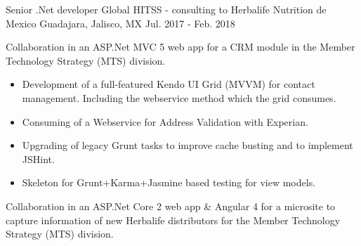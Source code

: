 \begin{cventries}
	\cventry
	{Senior .Net developer} %
	{Global HITSS - consulting to Herbalife Nutrition de Mexico} %
	{Guadajara, Jalisco, MX} %
	{Jul. 2017 - Feb. 2018} %
	{ %
		\begin{cvitems}
			\item {Collaboration in an ASP.Net MVC 5 web app for a CRM module in the Member Technology Strategy (MTS) division.}
			\begin{itemize}
				\item {Development of a full-featured Kendo UI Grid (MVVM) for contact management. Including the webservice method which the grid consumes.}
				\item {Consuming of a Webservice for Address Validation with Experian. }
				\item {Upgrading of legacy Grunt tasks to improve cache busting and to implement JSHint.}
				\item {Skeleton for Grunt+Karma+Jasmine based testing for view models.}
			\end{itemize}
			\item {Collaboration in an ASP.Net Core 2 web app \& Angular 4 for a microsite to capture information of new Herbalife distributors for the Member Technology Strategy (MTS) division.}
		\end{cvitems}
	}
	



\end{cventries}
